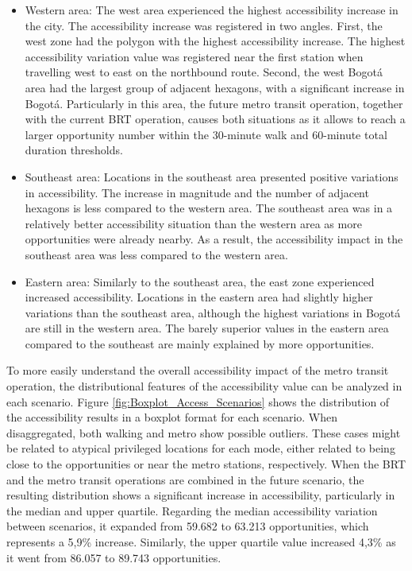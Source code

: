 \documentclass[12pt, a4paper]{report}
\begin{document}
\begin{itemize}
    \item Western area: The west area experienced the highest accessibility increase in the city. The accessibility increase was registered in two angles. First, the west zone had the polygon with the highest accessibility increase. The highest accessibility variation value was registered near the first station when travelling west to east on the northbound route. Second, the west Bogotá area had the largest group of adjacent hexagons, with a significant increase in Bogotá. Particularly in this area, the future metro transit operation, together with the current BRT operation, causes both situations as it allows to reach a larger opportunity number within the 30-minute walk and 60-minute total duration thresholds.
    \item Southeast area: Locations in the southeast area presented positive variations in accessibility. The increase in magnitude and the number of adjacent hexagons is less compared to the western area. The southeast area was in a relatively better accessibility situation than the western area as more opportunities were already nearby. As a result, the accessibility impact in the southeast area was less compared to the western area.
    \item Eastern area: Similarly to the southeast area, the east zone experienced increased accessibility. Locations in the eastern area had slightly higher variations than the southeast area, although the highest variations in Bogotá are still in the western area. The barely superior values in the eastern area compared to the southeast are mainly explained by more opportunities.
\end{itemize}

To more easily understand the overall accessibility impact of the metro transit operation, the distributional features of the accessibility value can be analyzed in each scenario. Figure \ref{fig:Boxplot_Access_Scenarios} shows the distribution of the accessibility results in a boxplot format for each scenario. When disaggregated, both walking and metro show possible outliers. These cases might be related to atypical privileged locations for each mode, either related to being close to the opportunities or near the metro stations, respectively. When the BRT and the metro transit operations are combined in the future scenario, the resulting distribution shows a significant increase in accessibility, particularly in the median and upper quartile. Regarding the median accessibility variation between scenarios, it expanded from 59.682 to 63.213 opportunities, which represents a 5,9\% increase. Similarly, the upper quartile value increased 4,3\% as it went from 86.057 to 89.743 opportunities.
\end{document}
